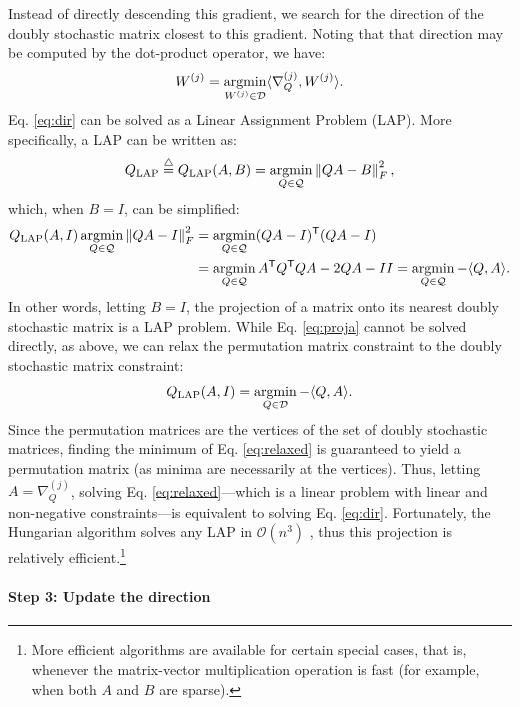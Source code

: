 \documentclass{article} %
\providecommand{\norm}[1]{\left \lVert#1 \right  \rVert}
\newcommand{\argmin}{\operatornamewithlimits{argmin}}
\newcommand{\T}{^{\ensuremath{\mathsf{T}}}}           %
\providecommand{\mc}[1]{\mathcal{#1}}
\newcommand{\defeq}{\overset{\triangle}{=}}
\begin{document}
Instead of directly descending this gradient, we search for the direction of the doubly stochastic matrix closest to this gradient. Noting that that direction may be computed by the dot-product operator, we have:
\begin{align}\label{eq:dir}
	W^{(j)} = \argmin_{W^{(j)} \in \mc{D}} \langle \nabla_Q^{(j)},W^{(j)} \rangle. %
\end{align}
Eq. \eqref{eq:dir} can be solved as a Linear Assignment Problem (LAP).  More specifically, a LAP can be written as:
\begin{align} \label{eq:LAP}
	Q_{\text{LAP}} \defeq Q_{\text{LAP}}(A,B) = \argmin_{Q \in \mc{Q}} \norm{QA - B }^2_F,
\end{align}
which, when $B=I$, can be simplified:
\begin{align} \label{eq:proja}
	Q_{\text{LAP}}(A,I) \argmin_{Q \in \mc{Q}} \norm{QA - I}_F^2 &= \argmin_{Q \in \mc{Q}} (QA-I)\T (QA-I) 
\nonumber\\ &=\argmin_{Q \in \mc{Q}} A\T Q\T QA -2QA - II = \argmin_{Q \in \mc{Q}}  -\langle Q, A \rangle.  
\end{align}
In other words, letting $B=I$, the projection of a matrix onto its nearest doubly stochastic matrix is a LAP problem.  While Eq. \eqref{eq:proja} cannot be solved directly, as above, we can relax the permutation matrix constraint to the doubly stochastic matrix constraint:
\begin{align}\label{eq:relaxed}
	Q_{\text{LAP}}(A,I) = \argmin_{Q\in\mc{D}} -\langle Q, A \rangle. 
\end{align}
Since the permutation matrices are the vertices of the set of doubly stochastic matrices, finding the minimum of Eq. \eqref{eq:relaxed} is guaranteed to yield a permutation matrix (as minima are necessarily at the vertices).  Thus, letting $A=\nabla_Q^{(j)}$, solving Eq. \eqref{eq:relaxed}---which is a linear problem with linear and non-negative constraints---is equivalent to solving Eq. \eqref{eq:dir}.  Fortunately, the Hungarian algorithm solves any LAP in $\mc{O}(n^3)$ \cite{Burkard2009}, thus this projection is relatively efficient.\footnote{More efficient algorithms are available for certain special cases, that is, whenever the matrix-vector multiplication operation is fast (for example, when both $A$ and $B$ are sparse).}

\paragraph{Step 3: Update the direction} %
\label{par:step_3_updating_the_direction}
\end{document}
